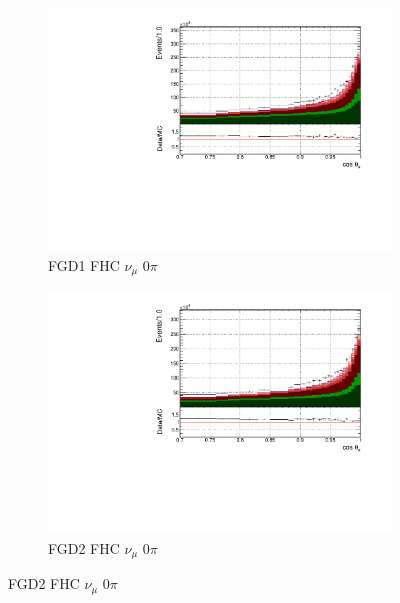 \begin{figure}[!h]
\begin{subfigure}{0.49\textwidth}
  \centering
  \includegraphics[width=\textwidth]{figs/FGD1_numuCC_0pi_t}
  \caption{FGD1 FHC $\nu_{\mu}$ 0$\pi$}
\end{subfigure}
\begin{subfigure}{0.49\textwidth}
  \centering
  \includegraphics[width=\textwidth]{figs/FGD2_numuCC_0pi_t}
  \caption{FGD2 FHC $\nu_{\mu}$ 0$\pi$}
\end{subfigure}


\end{figure}
